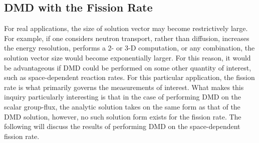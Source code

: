\documentclass[12pt]{article}
\begin{document}
\subsection{DMD with the Fission Rate}
For real applications, the size of solution vector may become restrictively large. For example, if one 
	considers neutron transport, rather than diffusion, increases the energy resolution,  performs a 2-
	or 3-D computation, or any combination, the solution vector size would become exponentially larger. 
For this reason, it would be  advantageous if DMD could be performed on some other  quantity of 	
	interest, such as space-dependent reaction rates.
For this particular application, the fission rate is what primarily governs the measurements of interest.
What makes this inquiry particularly interesting is that in the case of performing DMD on the scalar 
	group-flux, the analytic solution takes on the same form as that of the DMD solution, however, no 
	such solution form exists for the fission rate.
The following will discuss the results of performing DMD on the space-dependent fission rate.
\end{document}
